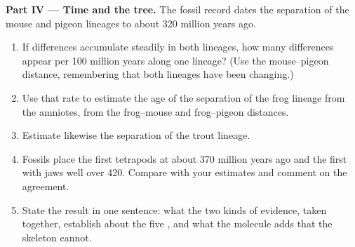 \begin{problem}
\medskip
\noindent\textbf{Part IV --- Time and the tree.}
The fossil record dates the separation of the mouse and pigeon
lineages to about 320 million years ago.
\begin{enumerate}[resume]
  \item If differences accumulate steadily in both lineages, how many
        differences appear per 100 million years along one lineage?
        (Use the mouse--pigeon distance, remembering that both
        lineages have been changing.)
  \item Use that rate to estimate the age of the separation of the
        frog lineage from the amniotes, from the frog--mouse and
        frog--pigeon distances.
  \item Estimate likewise the separation of the trout lineage.
  \item Fossils place the first tetrapods at about 370 million years
        ago and the first  with jaws well over 420. Compare
        with your estimates and comment on the agreement.
  \item State the result in one sentence: what the two kinds of
        evidence, taken together, establish about the five ,
        and what the molecule adds that the skeleton cannot.
\end{enumerate}
\end{problem}
